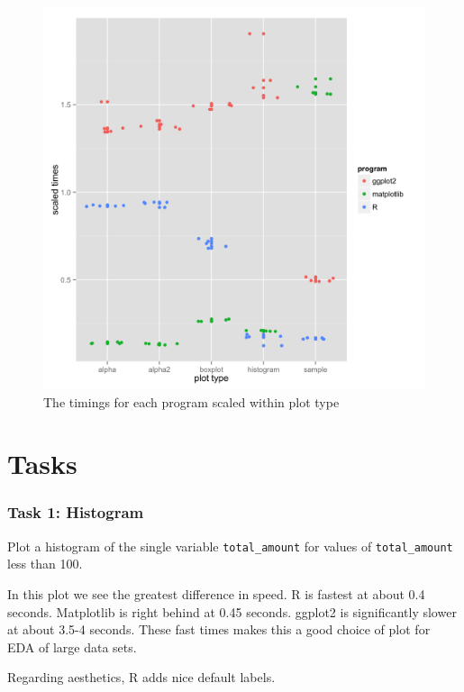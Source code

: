 \documentclass[]{article}
\begin{document}
\begin{figure}[htbp]
\centering
\includegraphics{timingplots2.png}
\caption{The timings for each program scaled within plot type}
\end{figure}

\section{Tasks}\label{tasks}

\subsubsection{Task 1: Histogram}\label{task-1-histogram}

Plot a histogram of the single variable \texttt{total\_amount} for
values of \texttt{total\_amount} less than 100.

In this plot we see the greatest difference in speed. R is fastest at
about 0.4 seconds. Matplotlib is right behind at 0.45 seconds. ggplot2
is significantly slower at about 3.5-4 seconds. These fast times makes
this a good choice of plot for EDA of large data sets.

Regarding aesthetics, R adds nice default labels.
\end{document}
